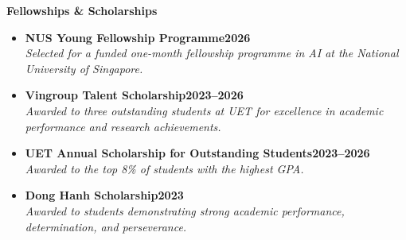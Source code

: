 \documentclass[11pt,a4paper]{article}
\newcommand{\smaller}{\small}
\newcommand{\heading}[2]{
  \noindent#1\hfill{\color{cvtextgray}#2}\\
}
\newcommand{\headingBf}[2]{
  \heading{\textbf{#1}}{\textbf{#2}}
}
\newcommand{\headingIt}[2]{
  \heading{\textit{#1}}{\textit{#2}}
}
\begin{document}
\textbf{Fellowships \& Scholarships}
\begin{itemize}[label={\smaller$\bullet$}]

    \item \headingBf{NUS Young Fellowship Programme}{2026}
    \headingIt{Selected for a funded one-month fellowship programme in AI at the National University of Singapore.}{}

    \item \headingBf{Vingroup Talent Scholarship}{2023--2026}
    \headingIt{Awarded to three outstanding students at UET for excellence in academic performance and research achievements.}{}

    \item \headingBf{UET Annual Scholarship for Outstanding Students}{2023--2026}
    \headingIt{Awarded to the top 8\% of students with the highest GPA.}{}

    \item \headingBf{Dong Hanh Scholarship}{2023}
    \headingIt{Awarded to students demonstrating strong academic performance, determination, and perseverance.}{}
\end{itemize}


    
    
\end{document}
